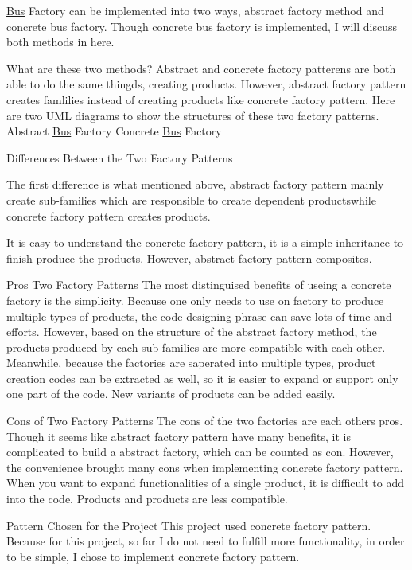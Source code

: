\hyperlink{classBus}{Bus} Factory can be implemented into two ways, abstract factory method and concrete bus factory. Though concrete bus factory is implemented, I will discuss both methods in here.
\begin{DoxyItemize}
\item What are these two methods? Abstract and concrete factory patterens are both able to do the same thingds, creating products. However, abstract factory pattern creates famlilies instead of creating products like concrete factory pattern. Here are two U\+ML diagrams to show the structures of these two factory patterns. Abstract \hyperlink{classBus}{Bus} Factory  Concrete \hyperlink{classBus}{Bus} Factory 
\item Differences Between the Two Factory Patterns
\end{DoxyItemize}
\begin{DoxyEnumerate}
\item The first difference is what mentioned above, abstract factory pattern mainly create sub-\/families which are responsible to create dependent productswhile concrete factory pattern creates products.
\item It is easy to understand the concrete factory pattern, it is a simple inheritance to finish produce the products. However, abstract factory pattern composites.
\end{DoxyEnumerate}
\begin{DoxyItemize}
\item Pros Two Factory Patterns The most distinguised benefits of useing a concrete factory is the simplicity. Because one only needs to use on factory to produce multiple types of products, the code designing phrase can save lots of time and efforts. However, based on the structure of the abstract factory method, the products produced by each sub-\/families are more compatible with each other. Meanwhile, because the factories are saperated into multiple types, product creation codes can be extracted as well, so it is easier to expand or support only one part of the code. New variants of products can be added easily.
\item Cons of Two Factory Patterns The cons of the two factories are each other\textquotesingle{}s pros. Though it seems like abstract factory pattern have many benefits, it is complicated to build a abstract factory, which can be counted as con. However, the convenience brought many cons when implementing concrete factory pattern. When you want to expand functionalities of a single product, it is difficult to add into the code. Products and products are less compatible.
\item Pattern Chosen for the Project This project used concrete factory pattern. Because for this project, so far I do not need to fulfill more functionality, in order to be simple, I chose to implement concrete factory pattern. 
\end{DoxyItemize}
